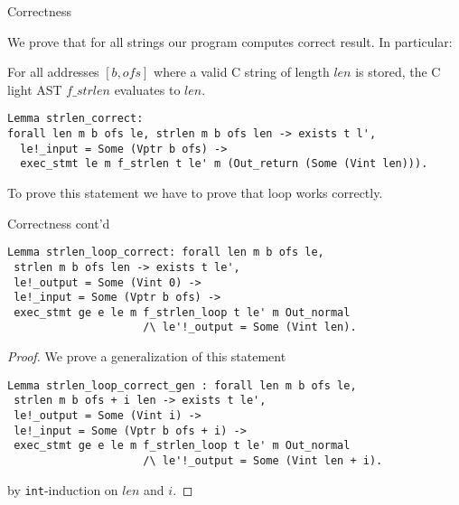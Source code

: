 \documentclass{beamer}
\begin{document}
\begin{frame}[fragile]{Correctness}

  We prove that for all strings our program computes correct result. In particular:
  
  \begin{theorem}
    For all addresses $[b, ofs]$ where a valid C string of length $len$ is stored, the C light AST $f\_strlen$ evaluates to $len$.
  \end{theorem}
  
  
  \begin{lstlisting}[language=Coq]
Lemma strlen_correct:
forall len m b ofs le, strlen m b ofs len -> exists t l',
  le!_input = Some (Vptr b ofs) ->
  exec_stmt le m f_strlen t le' m (Out_return (Some (Vint len))).

\end{lstlisting}

To prove this statement we have to prove that loop works correctly.

 



\end{frame}

  
\begin{frame}[fragile]{Correctness cont'd}

  
  
  \begin{lstlisting}[language=Coq]
 Lemma strlen_loop_correct: forall len m b ofs le,
 strlen m b ofs len -> exists t le',
 le!_output = Some (Vint 0) ->
 le!_input = Some (Vptr b ofs) ->
 exec_stmt ge e le m f_strlen_loop t le' m Out_normal
                     /\ le'!_output = Some (Vint len).
\end{lstlisting}

\begin{proof}
  We prove a generalization of this statement
  
 \begin{lstlisting}[language=Coq]
 Lemma strlen_loop_correct_gen : forall len m b ofs le,
 strlen m b ofs + i len -> exists t le',
 le!_output = Some (Vint i) ->
 le!_input = Some (Vptr b ofs + i) ->
 exec_stmt ge e le m f_strlen_loop t le' m Out_normal
                     /\ le'!_output = Some (Vint len + i).
\end{lstlisting}

by \texttt{int}-induction on $len$ and $i$. 

  \end{proof}

 



\end{frame}
\end{document}
